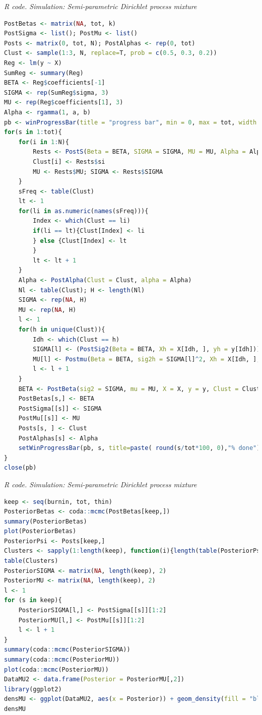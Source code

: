\begin{enumerate}[leftmargin=*]
\begin{tcolorbox}[enhanced,width=4.67in,center upper,
	fontupper=\large\bfseries,drop shadow southwest,sharp corners]
	\textit{R code. Simulation: Semi-parametric Dirichlet process mixture}
	\begin{VF}
		\begin{lstlisting}[language=R]
PostBetas <- matrix(NA, tot, k)
PostSigma <- list(); PostMu <- list()
Posts <- matrix(0, tot, N); PostAlphas <- rep(0, tot)
Clust <- sample(1:3, N, replace=T, prob = c(0.5, 0.3, 0.2))
Reg <- lm(y ~ X)
SumReg <- summary(Reg)
BETA <- Reg$coefficients[-1]
SIGMA <- rep(SumReg$sigma, 3)
MU <- rep(Reg$coefficients[1], 3)
Alpha <- rgamma(1, a, b)
pb <- winProgressBar(title = "progress bar", min = 0, max = tot, width = 300)
for(s in 1:tot){
	for(i in 1:N){
		Rests <- PostS(Beta = BETA, SIGMA = SIGMA, MU = MU, Alpha = Alpha, Clust = Clust, i = i)
		Clust[i] <- Rests$si
		MU <- Rests$MU; SIGMA <- Rests$SIGMA
	}
	sFreq <- table(Clust)
	lt <- 1
	for(li in as.numeric(names(sFreq))){
		Index <- which(Clust == li)
		if(li == lt){Clust[Index] <- li
		} else {Clust[Index] <- lt
		}
		lt <- lt + 1
	}
	Alpha <- PostAlpha(Clust = Clust, alpha = Alpha)
	Nl <- table(Clust); H <- length(Nl)
	SIGMA <- rep(NA, H)
	MU <- rep(NA, H)
	l <- 1
	for(h in unique(Clust)){
		Idh <- which(Clust == h)
		SIGMA[l] <- (PostSig2(Beta = BETA, Xh = X[Idh, ], yh = y[Idh]))^0.5
		MU[l] <- Postmu(Beta = BETA, sig2h = SIGMA[l]^2, Xh = X[Idh, ], yh = y[Idh])
		l <- l + 1
	}
	BETA <- PostBeta(sig2 = SIGMA, mu = MU, X = X, y = y, Clust = Clust) 
	PostBetas[s,] <- BETA
	PostSigma[[s]] <- SIGMA
	PostMu[[s]] <- MU
	Posts[s, ] <- Clust
	PostAlphas[s] <- Alpha
	setWinProgressBar(pb, s, title=paste( round(s/tot*100, 0),"% done"))
}
close(pb)
\end{lstlisting}
	\end{VF}
\end{tcolorbox}

\begin{tcolorbox}[enhanced,width=4.67in,center upper,
	fontupper=\large\bfseries,drop shadow southwest,sharp corners]
	\textit{R code. Simulation: Semi-parametric Dirichlet process mixture}
	\begin{VF}
		\begin{lstlisting}[language=R]
keep <- seq(burnin, tot, thin)
PosteriorBetas <- coda::mcmc(PostBetas[keep,])
summary(PosteriorBetas)
plot(PosteriorBetas)
PosteriorPsi <- Posts[keep,]
Clusters <- sapply(1:length(keep), function(i){length(table(PosteriorPsi[i,]))})
table(Clusters)
PosteriorSIGMA <- matrix(NA, length(keep), 2)
PosteriorMU <- matrix(NA, length(keep), 2)
l <- 1
for (s in keep){
	PosteriorSIGMA[l,] <- PostSigma[[s]][1:2]
	PosteriorMU[l,] <- PostMu[[s]][1:2]
	l <- l + 1
}
summary(coda::mcmc(PosteriorSIGMA))
summary(coda::mcmc(PosteriorMU))
plot(coda::mcmc(PosteriorMU))
DataMU2 <- data.frame(Posterior = PosteriorMU[,2]) 
library(ggplot2)
densMU <- ggplot(DataMU2, aes(x = Posterior)) + geom_density(fill = "blue", alpha = 0.3) + labs(x = "Intercept", y = "Density") + theme_minimal()
densMU 
\end{lstlisting}
	\end{VF}
\end{tcolorbox}


\end{enumerate}
